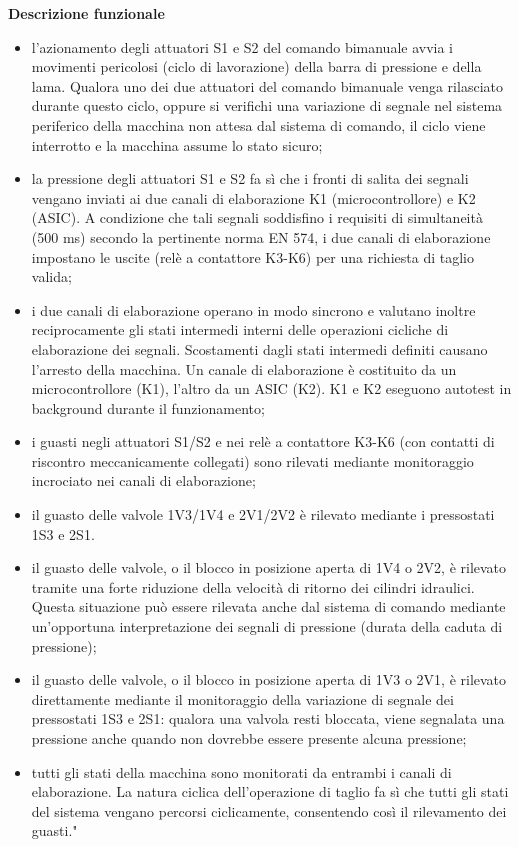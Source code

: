 \textbf{Descrizione funzionale}
\begin{itemize}
    \item l'azionamento degli attuatori S1 e S2 del comando bimanuale avvia i movimenti pericolosi (ciclo di lavorazione) della barra di pressione e della lama. Qualora uno dei due attuatori del comando bimanuale venga rilasciato durante questo ciclo, oppure si verifichi una variazione di segnale nel sistema periferico della macchina non attesa dal sistema di comando, il ciclo viene interrotto e la macchina assume lo stato sicuro;
    \item la pressione degli attuatori S1 e S2 fa sì che i fronti di salita dei segnali vengano inviati ai due canali di elaborazione K1 (microcontrollore) e K2 (ASIC). A condizione che tali segnali soddisfino i requisiti di simultaneità (500 ms) secondo la pertinente norma EN 574, i due canali di elaborazione impostano le uscite (relè a contattore K3-K6) per una richiesta di taglio valida;
    \item i due canali di elaborazione operano in modo sincrono e valutano inoltre reciprocamente gli stati intermedi interni delle operazioni cicliche di elaborazione dei segnali. Scostamenti dagli stati intermedi definiti causano l'arresto della macchina. Un canale di elaborazione è costituito da un microcontrollore (K1), l'altro da un ASIC (K2). K1 e K2 eseguono autotest in background durante il funzionamento;
    \item i guasti negli attuatori S1/S2 e nei relè a contattore K3-K6 (con contatti di riscontro meccanicamente collegati) sono rilevati mediante monitoraggio incrociato nei canali di elaborazione;
    \item il guasto delle valvole 1V3/1V4 e 2V1/2V2 è rilevato mediante i pressostati 1S3 e 2S1.
    \item il guasto delle valvole, o il blocco in posizione aperta di 1V4 o 2V2, è rilevato tramite una forte riduzione della velocità di ritorno dei cilindri idraulici. Questa situazione può essere rilevata anche dal sistema di comando mediante un'opportuna interpretazione dei segnali di pressione (durata della caduta di pressione);
    \item il guasto delle valvole, o il blocco in posizione aperta di 1V3 o 2V1, è rilevato direttamente mediante il monitoraggio della variazione di segnale dei pressostati 1S3 e 2S1: qualora una valvola resti bloccata, viene segnalata una pressione anche quando non dovrebbe essere presente alcuna pressione;
    \item tutti gli stati della macchina sono monitorati da entrambi i canali di elaborazione. La natura ciclica dell'operazione di taglio fa sì che tutti gli stati del sistema vengano percorsi ciclicamente, consentendo così il rilevamento dei guasti."
\end{itemize}

